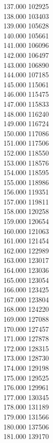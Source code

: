 { 137.000	102925 \\
 138.000	103403 \\
 139.000	105628 \\
 140.000	105661 \\
 141.000	106096 \\
 142.000	106497 \\
 143.000	106890 \\
 144.000	107185 \\
 145.000	115061 \\
 146.000	115475 \\
 147.000	115833 \\
 148.000	116240 \\
 149.000	116724 \\
 150.000	117086 \\
 151.000	117506 \\
 152.000	118550 \\
 153.000	118576 \\
 154.000	118595 \\
 155.000	118986 \\
 156.000	119351 \\
 157.000	119811 \\
 158.000	120258 \\
 159.000	120654 \\
 160.000	121063 \\
 161.000	121454 \\
 162.000	122989 \\
 163.000	123017 \\
 164.000	123036 \\
 165.000	123054 \\
 166.000	123425 \\
 167.000	123804 \\
 168.000	124220 \\
 169.000	127088 \\
 170.000	127457 \\
 171.000	127878 \\
 172.000	128315 \\
 173.000	128730 \\
 174.000	129198 \\
 175.000	129525 \\
 176.000	129961 \\
 177.000	130345 \\
 178.000	131189 \\
 179.000	131566 \\
 180.000	137506 \\
 181.000	139170 \\
}
